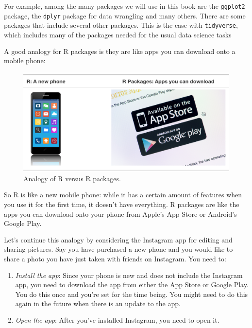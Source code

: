 \documentclass[
]{article}
\providecommand{\tightlist}{%
  \setlength{\itemsep}{0pt}\setlength{\parskip}{0pt}}
\begin{document}
For example, among the many packages we will use in this book are the
\texttt{ggplot2} package, the \texttt{dplyr} package for data wrangling
and many others. There are some packages that include several other
packages. This is the case with \texttt{tidyverse}, which includes many
of the packages needed for the usual data science tasks

A good analogy for R packages is they are like apps you can download
onto a mobile phone:

\begin{figure}
\centering
\includegraphics{../Figs/r_vs_r_packages.png}
\caption{Analogy of R versus R packages.}
\end{figure}

So R is like a new mobile phone: while it has a certain amount of
features when you use it for the first time, it doesn't have everything.
R packages are like the apps you can download onto your phone from
Apple's App Store or Android's Google Play.

Let's continue this analogy by considering the Instagram app for editing
and sharing pictures. Say you have purchased a new phone and you would
like to share a photo you have just taken with friends on Instagram. You
need to:

\begin{enumerate}
\def\labelenumi{\arabic{enumi}.}
\tightlist
\item
  \emph{Install the app}: Since your phone is new and does not include
  the Instagram app, you need to download the app from either the App
  Store or Google Play. You do this once and you're set for the time
  being. You might need to do this again in the future when there is an
  update to the app.
\item
  \emph{Open the app}: After you've installed Instagram, you need to
  open it.
\end{enumerate}
\end{document}
